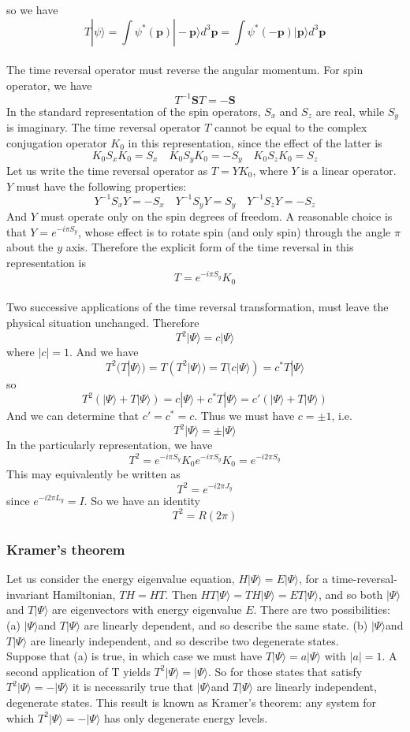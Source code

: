 so we have
\[T|\psi\rangle = \int \psi^*(\bm{p})|-\bm{p}\rangle d^3 \bm{p} = \int \psi^*(\bm{-p})|\bm{p}\rangle d^3 \bm{p}\]\\ 
The time reversal operator must reverse the angular momentum. For spin operator, we have
\[T^{-1}\bm{S}T = -\bm{S}\]
In the standard representation of the spin operators, $S_x$ and $S_z$ are real, while $S_y$ is imaginary. The time reversal operator $T$ cannot be equal to the complex conjugation operator $K_0$ in this representation, since the effect of the latter is
\[K_0S_xK_0 = S_x \quad K_0S_yK_0 = -S_y \quad K_0S_zK_0 = S_z\]
Let us write the time reversal operator as $T=YK_0$, where $Y$ is a linear operator. $Y$ must have the following properties:
\[Y^{-1}S_xY = -S_x \quad Y^{-1}S_yY = S_y \quad Y^{-1}S_zY = -S_z\]
And $Y$ must operate only on the spin degrees of freedom. A reasonable choice is that $Y = e^{-i\pi S_y}$, whose effect is
to rotate spin (and only spin) through the angle $\pi$ about the $y$ axis. Therefore the explicit form of the time reversal in this representation is
\[T = e^{-i\pi S_y}K_0\]\\
Two successive applications of the time reversal transformation, must leave the physical situation unchanged. Therefore
\[T^2|\Psi\rangle = c|\Psi\rangle\]
where $|c|=1$. And we have
\[T^2(T|\Psi\rangle) = T(T^2|\Psi\rangle) = T(c|\Psi\rangle) = c^* T|\Psi\rangle\]
so 
\[T^2(|\Psi\rangle + T|\Psi\rangle) = c|\Psi\rangle + c^* T|\Psi\rangle = c'(|\Psi\rangle + T|\Psi\rangle)\]
And we can determine that $c' = c^* = c$. Thus we must have $c = \pm 1$, i.e.
\[T^2|\Psi\rangle = \pm |\Psi\rangle\]
In the particularly representation, we have
\[T^2 = e^{-i\pi S_y}K_0 e^{-i\pi S_y}K_0 = e^{-i2\pi S_y}\]
This may equivalently be written as
\[T^2 = e^{-i2\pi J_y}\]
since $e^{-i2\pi L_y} = I$. So we have an identity
\[T^2 = R(2\pi)\]

\subsubsection{Kramer's theorem}
Let us consider the energy eigenvalue equation, $H|\Psi\rangle = E|\Psi\rangle$, for a time-reversal-invariant Hamiltonian, $TH=HT$. 
Then $HT|\Psi\rangle =  TH|\Psi\rangle = ET|\Psi\rangle$, and so
both $|\Psi\rangle$ and $T|\Psi\rangle$ are eigenvectors with energy eigenvalue $E$. 
There are two possibilities: 
(a) $|\Psi\rangle$and $T|\Psi\rangle$ are linearly dependent, and so describe the same state.
(b) $|\Psi\rangle$and $T|\Psi\rangle$ are linearly independent,
and so describe two degenerate states.\\
Suppose that (a) is true, in which case we must have $T|\Psi\rangle = a|\Psi\rangle$ with $|a|=1$. A second application of T yields $T^2|\Psi\rangle = |\Psi\rangle$. 
So for those states that satisfy $T^2|\Psi\rangle = -|\Psi\rangle$ it is necessarily true that $|\Psi\rangle$and $T|\Psi\rangle$ are linearly independent, degenerate states. This result is known as Kramer's theorem: any
system for which $T^2|\Psi\rangle = -|\Psi\rangle$ has only degenerate energy levels.
